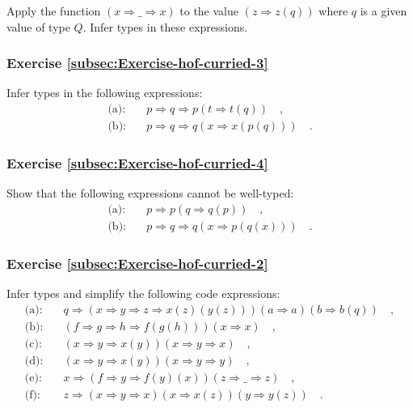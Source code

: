Apply the function $\left(x\Rightarrow\_\Rightarrow x\right)$ to
the value $\left(z\Rightarrow z(q)\right)$ where $q$ is a given
value of type $Q$. Infer types in these expressions.

\subsubsection{Exercise \label{subsec:Exercise-hof-curried-3}\ref{subsec:Exercise-hof-curried-3}}

Infer types in the following expressions:
\begin{align*}
\text{(a):}\quad & p\Rightarrow q\Rightarrow p(t\Rightarrow t(q))\quad,\\
\text{(b):}\quad & p\Rightarrow q\Rightarrow q(x\Rightarrow x(p(q)))\quad.
\end{align*}


\subsubsection{Exercise \label{subsec:Exercise-hof-curried-4}\ref{subsec:Exercise-hof-curried-4}}

Show that the following expressions cannot be well-typed:
\begin{align*}
\text{(a):}\quad & p\Rightarrow p(q\Rightarrow q(p))\quad,\\
\text{(b):}\quad & p\Rightarrow q\Rightarrow q(x\Rightarrow p(q(x)))\quad.
\end{align*}


\subsubsection{Exercise \label{subsec:Exercise-hof-curried-2}\ref{subsec:Exercise-hof-curried-2}}

Infer types and simplify the following code expressions:
\begin{align*}
\text{(a):}\quad & q\Rightarrow\left(x\Rightarrow y\Rightarrow z\Rightarrow x(z)(y(z))\right)\left(a\Rightarrow a\right)\left(b\Rightarrow b(q)\right)\quad,\\
\text{(b):}\quad & \left(f\Rightarrow g\Rightarrow h\Rightarrow f(g(h))\right)(x\Rightarrow x)\quad,\\
\text{(c):}\quad & \left(x\Rightarrow y\Rightarrow x(y)\right)\left(x\Rightarrow y\Rightarrow x\right)\quad,\\
\text{(d):}\quad & \left(x\Rightarrow y\Rightarrow x(y)\right)\left(x\Rightarrow y\Rightarrow y\right)\quad,\\
\text{(e):}\quad & x\Rightarrow\left(f\Rightarrow y\Rightarrow f(y)(x)\right)\left(z\Rightarrow\_\Rightarrow z\right)\quad,\\
\text{(f):}\quad & z\Rightarrow\left(x\Rightarrow y\Rightarrow x\right)\left(x\Rightarrow x(z)\right)(y\Rightarrow y(z))\quad.
\end{align*}



